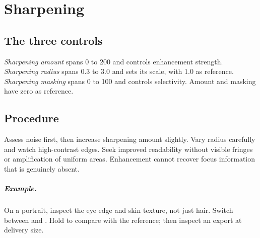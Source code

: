 \chapter{Sharpening}
\section{The three controls}
\emph{Sharpening amount} spans 0 to 200 and controls enhancement strength.
\emph{Sharpening radius} spans 0.3 to 3.0 and sets its scale, with 1.0 as reference.
\emph{Sharpening masking} spans 0 to 100 and controls selectivity.
Amount and masking have zero as reference.

\section{Procedure}
Assess noise first, then increase sharpening amount slightly. Vary radius
carefully and watch high-contrast edges. Seek improved readability without
visible fringes or amplification of uniform areas. Enhancement cannot recover
focus information that is genuinely absent.

\paragraph{Example.}
On a portrait, inspect the eye edge and skin texture, not just hair.
Switch between  and . Hold 
to compare with the reference; then inspect an export at delivery size.
\gestesreglages
